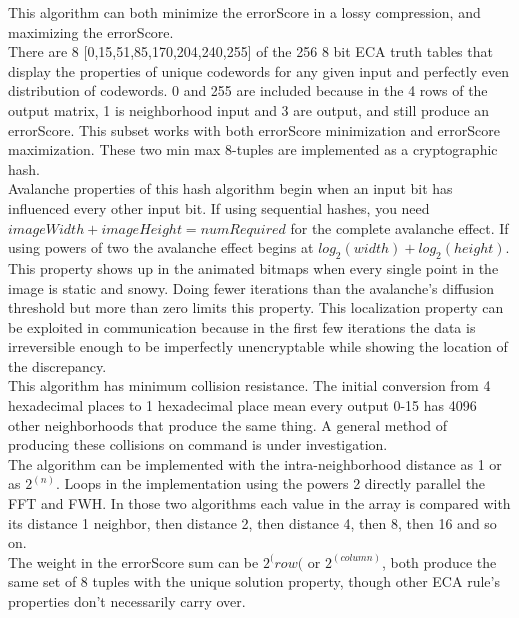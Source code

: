 \documentclass[11pt]{article}
\begin{document}
This algorithm can both minimize the errorScore in a lossy compression, and maximizing the errorScore.\\

There are 8 [0,15,51,85,170,204,240,255] of the 256 8 bit ECA truth tables that display the properties of unique codewords for any given input and perfectly even distribution of codewords. 0 and 255 are included because in the 4 rows of the output matrix, 1 is neighborhood input and 3 are output, and still produce an errorScore. This subset works with both errorScore minimization and errorScore maximization. These two min max 8-tuples are implemented as a cryptographic hash.\\

Avalanche properties of this hash algorithm begin when an input bit has influenced every other input bit. If using sequential hashes, you need $imageWidth+imageHeight=numRequired$ for the complete avalanche effect. If using powers of two the avalanche effect begins at $log_2 (width) + log_2 (height)$. This property shows up in the animated bitmaps when every single point in the image is static and snowy. Doing fewer iterations than the avalanche's diffusion threshold but more than zero limits this property. This localization property can be exploited in communication because in the first few iterations the data is irreversible enough to be imperfectly unencryptable while showing the location of the discrepancy.\\

This algorithm has minimum collision resistance. The initial conversion from 4 hexadecimal places to 1 hexadecimal place mean every output 0-15 has 4096 other neighborhoods that produce the same thing. A general method of producing these collisions on command is under investigation.\\

The algorithm can be implemented with the intra-neighborhood distance as 1 or as $2^(n)$. Loops in the implementation using the powers 2 directly parallel the FFT and FWH. In those two algorithms each value in the array is compared with its distance 1 neighbor, then distance 2, then distance 4, then 8, then 16 and so on.\\

The weight in the errorScore sum can be $2^(row($ or $2^(column)$, both produce the same set of 8 tuples with the unique solution property, though other ECA rule's properties don't necessarily carry over.\\
\end{document}
